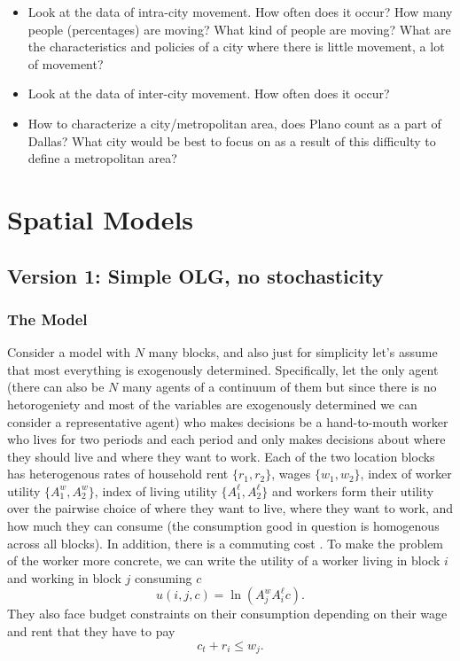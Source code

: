 \documentclass[11pt,english]{article}
\begin{document}
\begin{itemize}
\item Look at the data of intra-city movement. How often does it occur? How many people (percentages) are moving? What kind of people are moving? What are the characteristics and policies of a city where there is little movement, a lot of movement?

\item Look at the data of inter-city movement. How often does it occur?

\item How to characterize a city/metropolitan area, does Plano count as a part of Dallas? What city would be best to focus on as a result of this difficulty to define a metropolitan area?

\end{itemize}


\section{Spatial Models}

\subsection{Version 1: Simple OLG, no stochasticity}

\subsubsection{The Model}

Consider a model with $N$ many blocks, and also just for simplicity let's assume that most everything is exogenously determined. Specifically, let the only agent (there can also be $N$ many agents of a continuum of them but since there is no hetorogeniety and most of the variables are exogenously determined we can consider a representative agent) who makes decisions be a hand-to-mouth worker who lives for two periods and each period and only makes decisions about where they should live and where they want to work. Each of the two location blocks has heterogenous rates of household rent $\{r_1, r_2\}$, wages $\{w_1, w_2\}$, index of worker utility $\{A^w_1, A^w_2\}$, index of living utility $\{A^\ell_1, A^\ell_2\}$ and workers form their utility over the pairwise choice of where they want to live, where they want to work, and how much they can consume (the consumption good in question is homogenous across all blocks). In addition, there is a commuting cost . To make the problem of the worker more concrete, we can write the utility of a worker living in block $i$ and working in block $j$ consuming $c$ $$u(i,j, c) = \ln \left(A^w_jA^\ell_i c\right).$$ They also face budget constraints on their consumption depending on their wage and rent that they have to pay $$c_t + r_i \leq w_j.$$
\end{document}
